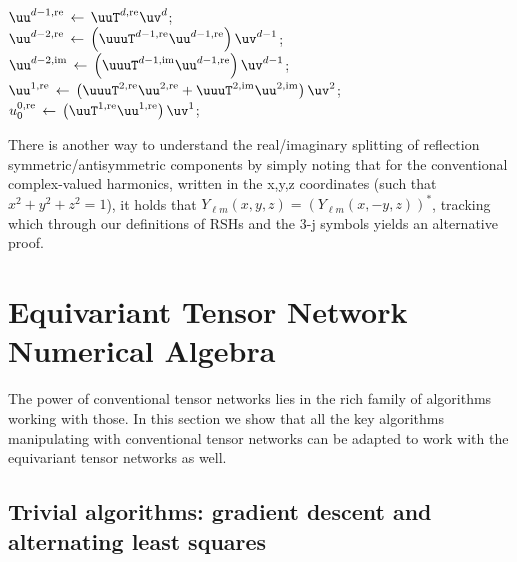 \begin{algorithm}[hbt]
    \LinesNumbered
    \caption{ETT contraction with four or more cores}
    \label{algo:ett-contraction_>3-cores}
    $\uu^{d-1,{\rm re}} \,\leftarrow\, \uuT^{d,{\rm re}} \uv^d$; \\
    $\uu^{d-2,{\rm re}} \,\leftarrow\, \left(\uuuT^{d-1,{\rm re}} \uu^{d-1,{\rm re}}\right) \uv^{d-1}$; \\
    $\uu^{d-2,{\rm im}} \,\leftarrow\, \left(\uuuT^{d-1,{\rm im}} \uu^{d-1,{\rm re}}\right) \uv^{d-1}$; \\
    $\uu^{1,{\rm re}} \,\leftarrow\, \left( \uuuT^{2,{\rm re}} \uu^{2,{\rm re}} + \uuuT^{2,{\rm im}} \uu^{2,{\rm im}} \right) \uv^{2}$; \\
    $u_0^{0,{\rm re}} \,\leftarrow\, \left(\uuT^{1,{\rm re}} \uu^{1,{\rm re}}\right) \uv^1$; \\
\end{algorithm}

There is another way to understand the real/imaginary splitting of reflection symmetric{\slash}antisymmetric components by simply noting that for the conventional complex-valued harmonics, written in the x,y,z coordinates (such that $x^2+y^2+z^2=1$), it holds that $Y_{\ell m}(x,y,z) = (Y_{\ell m}(x,-y,z))^\ast$, tracking which through our definitions of RSHs and the 3-j symbols yields an alternative proof.

\section{Equivariant Tensor Network Numerical Algebra}\label{sec:algebra}

The power of conventional tensor networks lies in the rich family of algorithms working with those.
In this section we show that all the key algorithms manipulating with conventional tensor networks can be adapted to work with the equivariant tensor networks as well.

\subsection{Trivial algorithms: gradient descent and alternating least squares}


